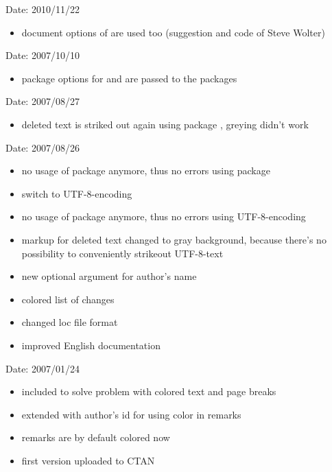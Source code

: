 
Date: 2010/11/22
\begin{itemize}
	\item document options of  are used too (suggestion and code of Steve Wolter)
\end{itemize}


Date: 2007/10/10
\begin{itemize}
	\item package options for  and  are passed to the packages
\end{itemize}


Date: 2007/08/27
\begin{itemize}
	\item deleted text is striked out again using package , greying didn't work
\end{itemize}


Date: 2007/08/26
\begin{itemize}
	\item no usage of package  anymore, thus no errors using package 
	\item switch to UTF-8-encoding
	\item no usage of package  anymore, thus no errors using UTF-8-encoding
	\item markup for deleted text changed to gray background, because there's no possibility to conveniently strikeout UTF-8-text
	\item new optional argument for author's name
	\item colored list of changes
	\item changed loc file format
	\item improved English documentation
\end{itemize}


Date: 2007/01/24
\begin{itemize}
	\item included  to solve problem with colored text and page breaks
	\item extended  with author's id for using color in remarks
	\item remarks are by default colored now
	\item first version uploaded to CTAN
\end{itemize}

